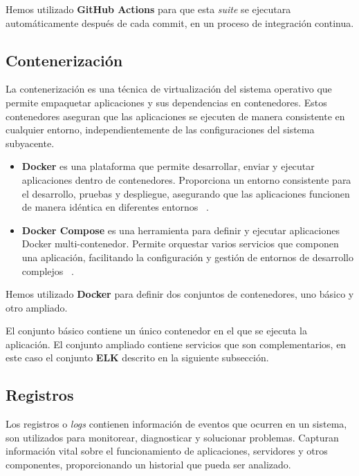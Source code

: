 Hemos utilizado \textbf{GitHub Actions} para que esta \textit{suite} se ejecutara automáticamente después de cada
commit, en un proceso de integración continua.

\subsection*{Contenerización}

La contenerización es una técnica de virtualización del sistema operativo que permite empaquetar aplicaciones y
sus dependencias en contenedores.
Estos contenedores aseguran que las aplicaciones se ejecuten de manera consistente en cualquier entorno,
independientemente de las configuraciones del sistema subyacente.

\begin{itemize}
    \item \textbf{Docker} es una plataforma que permite desarrollar, enviar y ejecutar aplicaciones dentro de
    contenedores.
    Proporciona un entorno consistente para el desarrollo, pruebas y despliegue, asegurando que las aplicaciones
    funcionen de manera idéntica en diferentes entornos ~\cite{https://docs.docker.com/}.
    \item \textbf{Docker Compose} es una herramienta para definir y ejecutar aplicaciones Docker multi-contenedor.
    Permite orquestar varios servicios que componen una aplicación, facilitando la configuración y gestión de entornos
    de desarrollo complejos ~\cite{https://docs.docker.com/compose/}.
\end{itemize}

Hemos utilizado \textbf{Docker} para definir dos conjuntos de contenedores, uno básico y otro ampliado.

El conjunto básico contiene un único contenedor en el que se ejecuta la aplicación.
El conjunto ampliado contiene servicios que son complementarios, en este caso el conjunto \textbf{ELK} descrito en la
siguiente subsección.

\subsection*{Registros}\label{subsec:chapter_4.logs}

Los registros o \textit{logs} contienen información de eventos que ocurren en un sistema, son utilizados para
monitorear, diagnosticar y solucionar problemas.
Capturan información vital sobre el funcionamiento de aplicaciones, servidores y otros componentes, proporcionando un
historial que pueda ser analizado.

